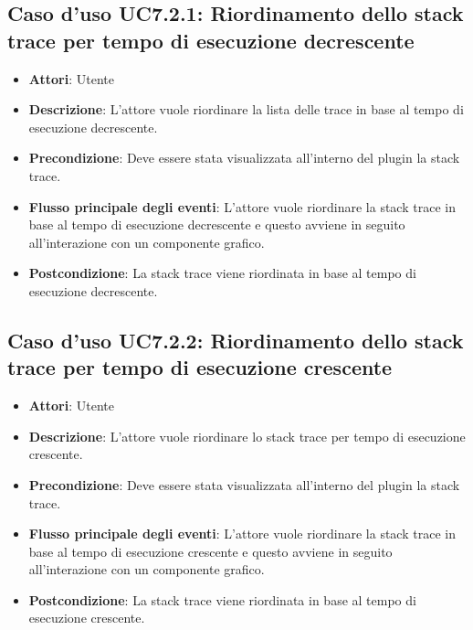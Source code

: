 \subsection{Caso d'uso UC7.2.1: Riordinamento dello stack trace per tempo di esecuzione decrescente}
\begin{itemize}
\item \textbf{Attori}: Utente
\item \textbf{Descrizione}: L'attore vuole riordinare la lista delle trace in base al tempo di esecuzione decrescente.
\item \textbf{Precondizione}: Deve essere stata visualizzata all'interno del plugin la stack trace.
\item \textbf{Flusso principale degli eventi}: L'attore vuole riordinare la stack trace in base al tempo di esecuzione decrescente e questo avviene in seguito all'interazione con un componente grafico.
\item \textbf{Postcondizione}: La stack trace viene riordinata in base al tempo di esecuzione decrescente.
\end{itemize}
\subsection{Caso d'uso UC7.2.2: Riordinamento dello stack trace per tempo di esecuzione crescente}
\begin{itemize}
\item \textbf{Attori}: Utente
\item \textbf{Descrizione}: L'attore vuole riordinare lo stack trace per tempo di esecuzione crescente.
\item \textbf{Precondizione}: Deve essere stata visualizzata all'interno del plugin la stack trace.
\item \textbf{Flusso principale degli eventi}: L'attore vuole riordinare la stack trace in base al tempo di esecuzione crescente e questo avviene in seguito all'interazione con un componente grafico.
\item \textbf{Postcondizione}: La stack trace viene riordinata in base al tempo di esecuzione crescente.
\end{itemize}
